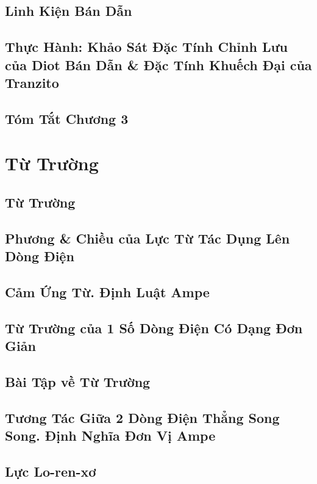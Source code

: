 \documentclass[oneside]{book}
\numberwithin{equation}{section}
\begin{document}
\section{Linh Kiện Bán Dẫn}

\section{Thực Hành: Khảo Sát Đặc Tính Chỉnh Lưu của Diot Bán Dẫn \& Đặc Tính Khuếch Đại của Tranzito}

\section{Tóm Tắt Chương 3}


\chapter{Từ Trường}

\section{Từ Trường}

\section{Phương \& Chiều của Lực Từ Tác Dụng Lên Dòng Điện}

\section{Cảm Ứng Từ. Định Luật Ampe}

\section{Từ Trường của 1 Số Dòng Điện Có Dạng Đơn Giản}

\section{Bài Tập về Từ Trường}

\section{Tương Tác Giữa 2 Dòng Điện Thẳng Song Song. Định Nghĩa Đơn Vị Ampe}

\section{Lực Lo-ren-xơ}
\end{document}
